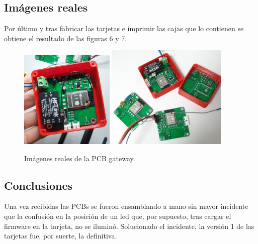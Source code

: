 \documentclass[paper=a4, fontsize=11pt,twoside]{scrartcl}	%
\begin{document}
    \subsection{Imágenes reales}
        Por último y tras fabricar las tarjetas e imprimir las cajas que lo contienen se obtiene el resultado de las figuras 6 y 7.
        \begin{center}
            \begin{figure}[ht]
                \centering
                \includegraphics[width=0.4\textwidth]{../3d_antenna.jpeg}
                \includegraphics[width=0.51\textwidth]{../real_master_pcb.jpeg}
                \caption{Imágenes reales de la PCB gateway.}
                \label{fig:mesh7}
            \end{figure}    
        \end{center}


    \subsection{Conclusiones}
        Una vez recibidas las PCBs se fueron ensamblando a mano sin mayor incidente que la confusión en la 
        posición de un led que, por supuesto, tras cargar el firmware en la tarjeta, no se iluminó.
        Solucionado el incidente, la versión 1 de las tarjetas fue, por suerte, la definitiva.
\end{document}
